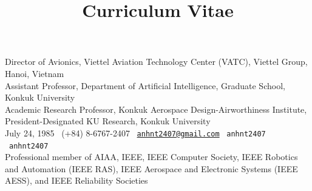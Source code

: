 \documentclass[a4paper,skipsamekey,11pt,english]{curve}
\title{Curriculum Vitae}
\begin{document}
\makeheaders[c]

{\small
\noindent
\faBuilding\;Director of Avionics, Viettel Aviation Technology Center (VATC), Viettel Group, Hanoi, Vietnam
\\
\faUniversity\;Assistant Professor, Department of Artificial Intelligence, Graduate School, Konkuk University
\\ 
\faUniversity\;Academic Research Professor, Konkuk Aerospace Design-Airworthiness Institute, President-Designated KU Research, Konkuk University \\[3pt]

\faBirthdayCake\;July 24, 1985 \textbar\ 
\faMobile*\;(+84) 8-6767-2407 \textbar\ 
\faEnvelope[regular]\;\href{mailto:anhnt2407@gmail.com}{\texttt{anhnt2407@gmail.com}} \textbar\ 
\faGithub\;\texttt{anhnt2407} \textbar\ \faLinkedin\;\texttt{anhnt2407} \\[3pt] 
\faBookmark\;Professional member of AIAA, IEEE, IEEE Computer Society, IEEE Robotics and Automation (IEEE RAS), IEEE Aerospace and Electronic Systems (IEEE AESS), and IEEE Reliability Societies
}
\end{document}
